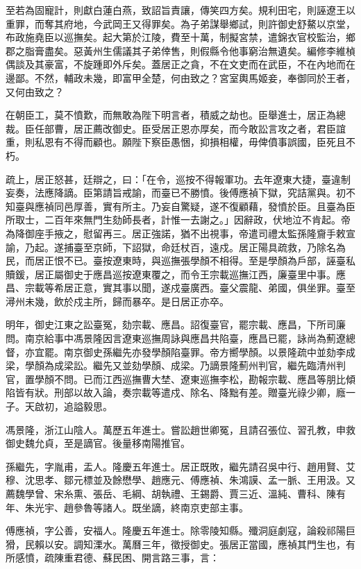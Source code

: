 \begin{pinyinscope}
至若為固寵計，則獻白蓮白燕，致詔旨責讓，傳笑四方矣。規利田宅，則誣遼王以重罪，而奪其府地，今武岡王又得罪矣。為子弟謀舉鄉試，則許御史舒鰲以京堂，布政施堯臣以巡撫矣。起大第於江陵，費至十萬，制擬宮禁，遣錦衣官校監治，鄉郡之脂膏盡矣。惡黃州生儒議其子弟倖售，則假縣令他事窮治無遺矣。編修李維楨偶談及其豪富，不旋踵即外斥矣。蓋居正之貪，不在文吏而在武臣，不在內地而在邊鄙。不然，輔政未幾，即富甲全楚，何由致之？宮室輿馬姬妾，奉御同於王者，又何由致之？

在朝臣工，莫不憤歎，而無敢為陛下明言者，積威之劫也。臣舉進士，居正為總裁。臣任部曹，居正薦改御史。臣受居正恩亦厚矣，而今敢訟言攻之者，君臣誼重，則私恩有不得而顧也。願陛下察臣愚悃，抑損相權，毋俾僨事誤國，臣死且不朽。

疏上，居正怒甚，廷辯之，曰：「在令，巡按不得報軍功。去年遼東大捷，臺違制妄奏，法應降謫。臣第請旨戒諭，而臺已不勝憤。後傅應禎下獄，究詰黨與。初不知臺與應禎同邑厚善，實有所主。乃妄自驚疑，遂不復顧藉，發憤於臣。且臺為臣所取士，二百年來無門生劾師長者，計惟一去謝之。」因辭政，伏地泣不肯起。帝為降御座手掖之，慰留再三。居正強諾，猶不出視事，帝遣司禮太監孫隆齎手敕宣諭，乃起。遂捕臺至京師，下詔獄，命廷杖百，遠戍。居正陽具疏救，乃除名為民，而居正恨不已。臺按遼東時，與巡撫張學顏不相得。至是學顏為戶部，誣臺私贖鍰，居正屬御史于應昌巡按遼東覆之，而令王宗載巡撫江西，廉臺里中事。應昌、宗載等希居正意，實其事以聞，遂戍臺廣西。臺父震龍、弟國，俱坐罪。臺至潯州未幾，飲於戍主所，歸而暴卒。是日居正亦卒。

明年，御史江東之訟臺冤，劾宗載、應昌。詔復臺官，罷宗載、應昌，下所司廉問。南京給事中馮景隆因言遼東巡撫周詠與應昌共陷臺，應昌已罷，詠尚為薊遼總督，亦宜罷。南京御史孫繼先亦發學顏陷臺罪。帝方嚮學顏。以景隆疏中並劾李成梁，學顏為成梁訟。繼先又並劾學顏、成梁。乃謫景隆薊州判官，繼先臨清州判官，置學顏不問。已而江西巡撫曹大埜、遼東巡撫李松，勘報宗載、應昌等朋比傾陷皆有狀。刑部以故入論，奏宗載等遣戍、除名、降黜有差。贈臺光祿少卿，廕一子。天啟初，追謚毅思。

馮景隆，浙江山陰人。萬歷五年進士。嘗訟趙世卿冤，且請召張位、習孔教，申救御史魏允貞，至是謫官。後量移南陽推官。

孫繼先，字胤甫，盂人。隆慶五年進士。居正既敗，繼先請召吳中行、趙用賢、艾穆、沈思孝、鄒元標並及餘懋學、趙應元、傅應禎、朱鴻謨、孟一脈、王用汲。又薦魏學曾、宋糸熏、張岳、毛綱、胡執禮、王錫爵、賈三近、溫純、曹科、陳有年、朱光宇、趙參魯等諸人。既坐謫，終南京吏部主事。

傅應禎，字公善，安福人。隆慶五年進士。除零陵知縣。殲洞庭劇寇，論殺祁陽巨猾，民賴以安。調知溧水。萬曆三年，徵授御史。張居正當國，應禎其門生也，有所感憤，疏陳重君德、蘇民困、開言路三事，言：


\end{pinyinscope}
